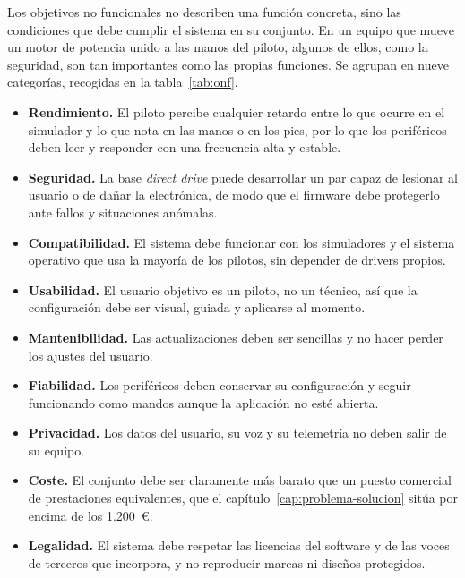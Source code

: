 Los objetivos no funcionales no describen una función concreta, sino las condiciones que debe cumplir el sistema en su conjunto. En un equipo que mueve un motor de potencia unido a las manos del piloto, algunos de ellos, como la seguridad, son tan importantes como las propias funciones. Se agrupan en nueve categorías, recogidas en la tabla~\ref{tab:onf}.

\begin{itemize}
	\item \textbf{Rendimiento.} El piloto percibe cualquier retardo entre lo que ocurre en el simulador y lo que nota en las manos o en los pies, por lo que los periféricos deben leer y responder con una frecuencia alta y estable.
	\item \textbf{Seguridad.} La base \emph{direct drive} puede desarrollar un par capaz de lesionar al usuario o de dañar la electrónica, de modo que el firmware debe protegerlo ante fallos y situaciones anómalas.
	\item \textbf{Compatibilidad.} El sistema debe funcionar con los simuladores y el sistema operativo que usa la mayoría de los pilotos, sin depender de drivers propios.
	\item \textbf{Usabilidad.} El usuario objetivo es un piloto, no un técnico, así que la configuración debe ser visual, guiada y aplicarse al momento.
	\item \textbf{Mantenibilidad.} Las actualizaciones deben ser sencillas y no hacer perder los ajustes del usuario.
	\item \textbf{Fiabilidad.} Los periféricos deben conservar su configuración y seguir funcionando como mandos aunque la aplicación no esté abierta.
	\item \textbf{Privacidad.} Los datos del usuario, su voz y su telemetría no deben salir de su equipo.
	\item \textbf{Coste.} El conjunto debe ser claramente más barato que un puesto comercial de prestaciones equivalentes, que el capítulo~\ref{cap:problema-solucion} sitúa por encima de los 1.200~€.
	\item \textbf{Legalidad.} El sistema debe respetar las licencias del software y de las voces de terceros que incorpora, y no reproducir marcas ni diseños protegidos.
\end{itemize}

